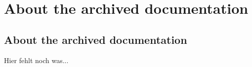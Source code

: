 \chapter{About the archived documentation}
\section{About the archived documentation}

Hier fehlt noch was...